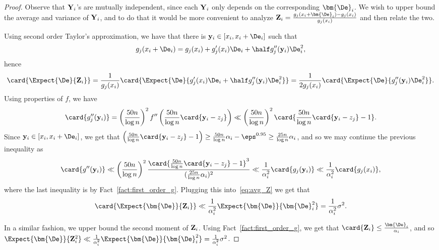 \begin{proof}
     Observe that ${\bf Y}_i$'s are mutually independent, since each ${\bf Y}_i$ only depends on
	 the corresponding $\bm{\De}_i$. We wish to upper bound the average and variance of ${\bf Y}_i$,
     and to do that it would be more convenient to analyze ${\bf Z}_i = \frac{ g_j(x_i+\bm{\De}_i)-g_j(x_i)}{g_j(x_i)}$
     and then relate the two.

     Using second order Taylor's approximation, we have that there is ${\bf y}_i\in[x_i,x_i+{\bf \De}_i]$ such that
     \[
       g_j(x_i+{\bf \De}_i) = g_j(x_i) + g_j'(x_i){\bf \De}_i + \half g_j''({\bf y}_i){\bf \De}_i^2,
     \]
     hence
     \begin{equation}\label{eq:avg_Z}
       \card{\Expect{{\bf \De}}{{\bf Z}_i}}
       =\frac{1}{g_j(x_i)}\card{\Expect{\De}{g_j'(x_i){\bf \De}_i + \half g_j''({\bf y}_i){\bf \De}_i^2}}
       =\frac{1}{2g_j(x_i)}\card{\Expect{\De}{g_j''({\bf y}_i){\bf \De}_i^2}}.
     \end{equation}
     Using properties of $f$, we have
     \[
     \card{g_j''({\bf y}_i)} =
     \left(\frac{50n}{\log n}\right)^2 f''\left(\frac{50n}{\log n}\card{{\bf y}_i-z_j}\right)
     \ll \left(\frac{50n}{\log n}\right)^2 \card{\frac{50n}{\log n}\card{{\bf y}_i-z_j}-1}.
     \]
     Since ${\bf y}_i\in [x_i,x_i+{\bf \De}_i]$, we get that
     $
     \left(\frac{50n}{\log n}\card{{\bf y}_i-z_j}-1\right)
     \geq \frac{50n}{\log n}\alpha_i - \eps^{0.95}
     \geq \frac{25n}{\log n}\alpha_i
     $,
     and so we may continue the previous inequality as
     \[
     \card{g''({\bf y}_i)}
     \ll \left(\frac{50n}{\log n}\right)^2\frac{\card{\frac{50n}{\log n}\card{{\bf y}_i-z_j}-1}^3}{(\frac{25n}{\log n}\alpha_i)^2}
     \ll \frac{1}{\alpha_i^2} \card{g_j({\bf y}_i)}
     \ll \frac{1}{\alpha_i^2} \card{g_j(x_i)},
     \]
     where the last inequality is by Fact~\ref{fact:first_order_g}.
     Plugging this into~\eqref{eq:avg_Z} we get that
     \[
     \card{\Expect{\bm{\De}}{{\bf Z}_i}}
     \ll \frac{1}{\alpha_i^2} \Expect{\bm{\De}}{\bm{\De}_i^2}
     =\frac{1}{\alpha_i^2} \sigma^2.
     \]

	 In a similar fashion, we upper bound the second moment of ${\bf Z}_i$.
     Using Fact~\ref{fact:first_order_g}, we get that $\card{{\bf Z}_i}\leq \frac{\bm{\De}_i}{\alpha_i}$, and
     so $\Expect{\bm{\De}}{{\bf Z}_i^2}\ll \frac{1}{\alpha_i^2}\Expect{\bm{\De}}{\bm{\De}_i^2} =\frac{1}{\alpha_i^2} \sigma^2$.





\end{proof}
